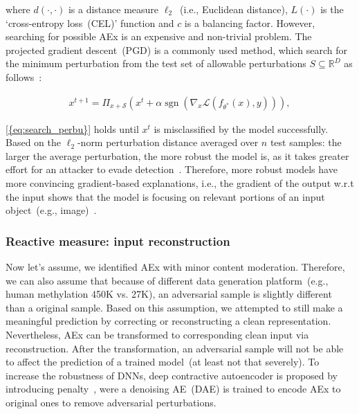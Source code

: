 \hspace*{3.5mm} where $d(\cdot, \cdot)$ is a distance measure $\ell_{2}$~(i.e., Euclidean distance), ${L}(\cdot)$ is the `cross-entropy loss~(CEL)' function and $c$ is a balancing factor. However, searching for possible AEx is an expensive and non-trivial problem. The projected gradient descent~(PGD) is a commonly used method, which search for the minimum perturbation from the test set of allowable perturbations ${S} \subseteq \mathbb{R}^{D}$ as follows~\cite{bhatt2020explainable}: 

\vspace{-6mm}
\begin{align}
    x^{t+1}=\Pi_{x+\mathcal{S}}\left(x^{t}+\alpha \operatorname{sgn}\left(\nabla_{x} \mathcal{L}\left(f_{\theta^{*}}(x), y\right)\right)\right),
    \label{eq:search_perbu}
\end{align}

\hspace*{3.5mm}\cref{{eq:search_perbu}} holds until $x^{t}$ is misclassified by the model successfully. Based on the $\ell_{2}$-norm perturbation distance averaged over $n$ test samples: the larger the average perturbation, the more robust the model is, as it takes greater effort for an attacker to evade detection~\cite{bhatt2020explainable,yuan2019adversarial}. 
Therefore, more robust models have more convincing gradient-based explanations, i.e., the gradient of the output w.r.t the input shows that the model is focusing on relevant portions of an input object~(e.g., image)~\cite{bhatt2020explainable}.

\subsubsection{Reactive measure: input reconstruction}
Now let's assume, we identified AEx with minor content moderation. Therefore, we can also assume that because of different data generation platform~(e.g., human methylation 450K vs. 27K), an adversarial sample is slightly different than a original sample. Based on this assumption, we attempted to still make a meaningful prediction by correcting or reconstructing a clean representation. Nevertheless, AEx can be transformed to corresponding clean input via reconstruction. After the transformation, an adversarial sample will not be able to affect the prediction of a trained model~(at least not that severely). 
To increase the robustness of DNNs, deep contractive autoencoder is proposed by introducing penalty~\cite{meng2017magnet}, were a denoising AE~(DAE) is trained to encode AEx to original ones to remove adversarial perturbations. 

